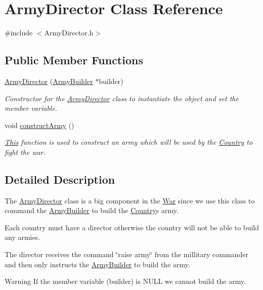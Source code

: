 \hypertarget{class_army_director}{}\section{Army\+Director Class Reference}
\label{class_army_director}


{\ttfamily \#include $<$Army\+Director.\+h$>$}

\subsection*{Public Member Functions}
\begin{DoxyCompactItemize}
\item 
\mbox{\hyperlink{class_army_director_a5d24ebede0923adfbb6dd8b06af3809f}{Army\+Director}} (\mbox{\hyperlink{class_army_builder}{Army\+Builder}} $\ast$builder)
\begin{DoxyCompactList}\small\item\em Constructor for the \mbox{\hyperlink{class_army_director}{Army\+Director}} class to instantiate the object and set the member variable. \end{DoxyCompactList}\item 
void \mbox{\hyperlink{class_army_director_a18fcc0cd2f4122ed600388f12efe92b9}{construct\+Army}} ()
\begin{DoxyCompactList}\small\item\em \mbox{\hyperlink{class_this}{This}} function is used to construct an army which will be used by the \mbox{\hyperlink{class_country}{Country}} to fight the war. \end{DoxyCompactList}\end{DoxyCompactItemize}


\subsection{Detailed Description}
The \mbox{\hyperlink{class_army_director}{Army\+Director}} class is a big component in the \mbox{\hyperlink{class_war}{War}} since we use this class to command the \mbox{\hyperlink{class_army_builder}{Army\+Builder}} to build the \mbox{\hyperlink{class_country}{Country}}\textquotesingle{}s army.
\begin{DoxyItemize}
\item Each country must have a director otherwise the country will not be able to build any armies.
\item The director receives the command \char`\"{}raise army\char`\"{} from the millitary commander and then only instructs the \mbox{\hyperlink{class_army_builder}{Army\+Builder}} to build the army. \begin{DoxyWarning}{Warning}
If the member variable (builder) is N\+U\+LL we cannot build the army. 
\end{DoxyWarning}

\end{DoxyItemize}

